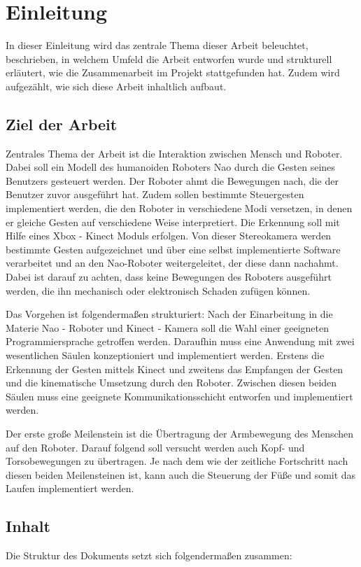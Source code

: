 \chapter{Einleitung}      %
\label{Einleitung}

In dieser Einleitung wird das zentrale Thema dieser Arbeit beleuchtet, beschrieben, in welchem Umfeld die Arbeit entworfen wurde und strukturell erläutert, wie die Zusammenarbeit im Projekt stattgefunden hat. Zudem wird aufgezählt, wie sich diese Arbeit inhaltlich aufbaut.

\section{Ziel der Arbeit}
Zentrales Thema der Arbeit ist die Interaktion zwischen Mensch und Roboter. Dabei soll ein Modell des humanoiden Roboters Nao durch die Gesten seines Benutzers gesteuert werden. Der Roboter ahmt die Bewegungen nach, die der Benutzer zuvor ausgeführt hat. Zudem sollen bestimmte Steuergesten implementiert werden, die den Roboter in verschiedene Modi versetzen, in denen er gleiche Gesten auf verschiedene Weise interpretiert. Die Erkennung soll mit Hilfe eines Xbox - Kinect Moduls erfolgen. Von dieser Stereokamera werden bestimmte Gesten aufgezeichnet und über eine selbst implementierte Software verarbeitet und an den Nao-Roboter weitergeleitet, der diese dann nachahmt. Dabei ist darauf zu achten, dass keine Bewegungen des Roboters ausgeführt werden, die ihn mechanisch oder elektronisch Schaden zufügen können.

Das Vorgehen ist folgendermaßen strukturiert: Nach der Einarbeitung in die Materie Nao - Roboter und Kinect - Kamera soll die Wahl einer geeigneten Programmiersprache getroffen werden. Daraufhin muss eine  Anwendung mit zwei wesentlichen Säulen konzeptioniert und implementiert werden. Erstens die Erkennung der Gesten mittels Kinect und zweitens das Empfangen der Gesten und die kinematische Umsetzung durch den Roboter. Zwischen diesen beiden Säulen muss eine geeignete Kommunikationsschicht entworfen und implementiert werden.

Der erste große Meilenstein ist die Übertragung der Armbewegung des Menschen auf den Roboter. Darauf folgend soll versucht werden auch Kopf- und Torsobewegungen zu übertragen. Je nach dem wie der zeitliche Fortschritt nach diesen beiden Meilensteinen ist, kann auch die Steuerung der Füße und somit das Laufen implementiert werden.


\section{Inhalt}
Die Struktur des Dokuments setzt sich folgendermaßen zusammen: 


